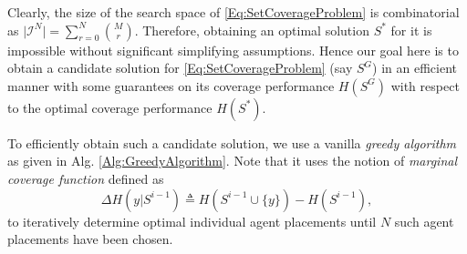 \documentclass[letterpaper, 10 pt, conference]{ieeeconf}
\begin{document}




Clearly, the size of the search space of \eqref{Eq:SetCoverageProblem} is combinatorial as $\vert \mathcal{I}^N \vert = \sum_{r=0}^N {M \choose r}$. Therefore, obtaining an optimal solution $S^*$ for it is impossible without significant simplifying assumptions. Hence our goal here is to obtain a candidate solution for \eqref{Eq:SetCoverageProblem} (say $S^G$) in an efficient manner with some guarantees on its coverage performance $H(S^G)$ with respect to the optimal coverage performance $H(S^*)$. 



To efficiently obtain such a candidate solution, we use a vanilla \emph{greedy algorithm} as given in Alg. \ref{Alg:GreedyAlgorithm}. Note that it uses the notion of \emph{marginal coverage function} defined as
\begin{equation}\label{Eq:MarginalCoverage}
    \Delta H(y \vert S^{i-1}) \triangleq H(S^{i-1}\cup\{y\}) - H(S^{i-1}),
\end{equation}
to iteratively determine optimal individual agent placements until $N$ such agent placements have been chosen.  
\end{document}
